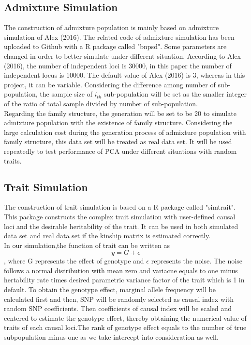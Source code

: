 \documentclass[12pt]{article}
\begin{document}
\subsection{Admixture Simulation}
The construction of admixture population is mainly based on admixture simulation of Alex (2016). The related code of admixture simulation has been uploaded to Github with a R package called "bnpsd".  Some parameters are changed in order to better simulate under different situation. According to Alex (2016), the number of independent loci is 30000, in this paper the number of independent locus is 10000. The default value of Alex (2016) is 3, whereas in this project, it can be variable. Considering the difference among number of sub-population, the sample size of $i_{th}$ sub-population will be set as the smaller integer of the ratio of total sample divided by number of sub-population.\\
Regarding the family structure, the generation will be set to be 20 to simulate admixture population with the existence of family structure. Considering the large calculation cost during the generation process of admixture population with family structure, this data set will be treated as real data set. It will be used repeatedly to test performance of PCA under different situations with random traits.



\subsection{Trait Simulation}
The construction of trait simulation is based on a R package called "simtrait". This package constructs the complex trait simulation with user-defined causal loci and the desirable heritability of the trait. It can be used in both simulated data set and real data set if the kinship matrix is estimated correctly. \\
In our simulation,the function of trait can be written as $$y=G+ \epsilon$$ 
, where G represents the effect of genotype and $\epsilon$ represents the noise. The noise follows a normal distribution with mean zero and variacne equals to one minus hertability rate times desired parametric variance factor of the trait which is 1 in default. To obtain the genotype effect, marginal allele frequency will be calculated first and then, SNP will be randomly selected as causal index with random SNP coefficients. Then  coefficients of causal index will be scaled and centered to estimate the genotype effect, thereby obtaining the numerical value of traits of each causal loci.The rank of genotype effect equals to the number of true subpopulation minus one as we take intercept into consideration as well.  
\end{document}
